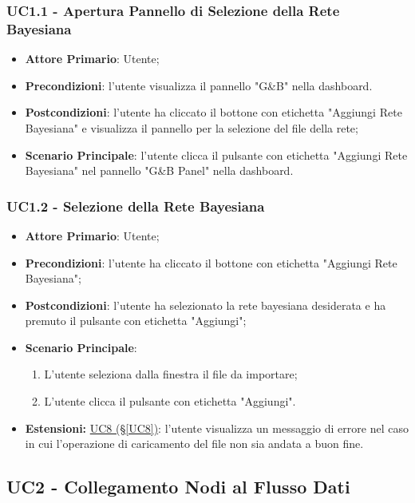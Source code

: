 \subsubsection{UC1.1 - Apertura Pannello di Selezione della Rete Bayesiana}\label{UC1.1}
\begin{itemize}
	\item \textbf{Attore Primario}: Utente; 
	\item \textbf{Precondizioni}: l'utente visualizza il pannello "G\&B" nella dashboard.
	\item \textbf{Postcondizioni}: l'utente ha cliccato il bottone con etichetta "Aggiungi Rete Bayesiana" e visualizza il pannello per la selezione del file della rete;
	\item \textbf{Scenario Principale}: l'utente clicca il pulsante con etichetta "Aggiungi Rete Bayesiana" nel pannello "G\&B Panel" nella dashboard.
\end{itemize}


\subsubsection{UC1.2 - Selezione della Rete Bayesiana}\label{UC1.2}
\begin{itemize}
	\item \textbf{Attore Primario}: Utente;
	\item \textbf{Precondizioni}: l'utente ha cliccato il bottone con etichetta "Aggiungi Rete Bayesiana";
	\item \textbf{Postcondizioni}: l'utente ha selezionato la rete bayesiana desiderata e ha premuto il pulsante con etichetta "Aggiungi";
	\item \textbf{Scenario Principale}:
	\begin{enumerate}
		\item L'utente seleziona dalla finestra il file da importare;
		\item L'utente clicca il pulsante con etichetta "Aggiungi".
	\end{enumerate}
	\item \textbf{Estensioni:} \hyperref[UC8]{UC8 (§\ref*{UC8})}: l'utente visualizza un messaggio di errore nel caso in cui l'operazione di caricamento del file non sia andata a buon fine.
\end{itemize}

\pagebreak

\subsection{UC2 - Collegamento Nodi al Flusso Dati}\label{UC2}

